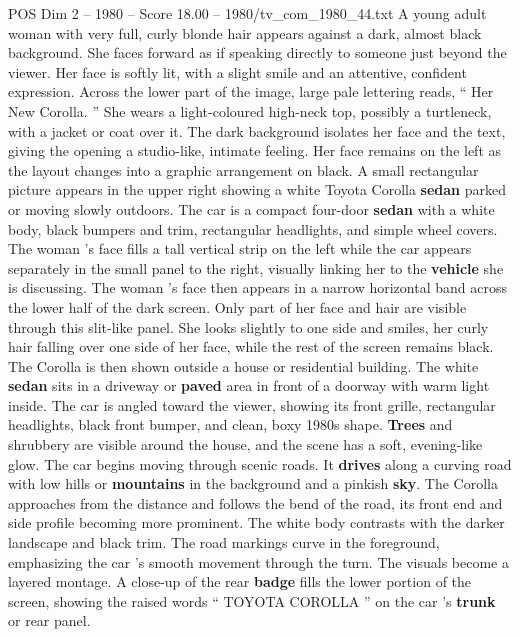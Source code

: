 \begin{textsample}{POS Dim 2 – 1980 – Score 18.00 – 1980/tv\_com\_1980\_44.txt}  \label{ex:f2_pos_064}
A young adult woman with very full, curly blonde hair appears against a dark, almost black background.
She faces forward as if speaking directly to someone just beyond the viewer.
Her face is softly lit, with a slight smile and an attentive, confident expression.
Across the lower part of the image, large pale lettering reads, “ Her New Corolla. ” She wears a light-coloured high-neck top, possibly a turtleneck, with a jacket or coat over it.
The dark background isolates her face and the text, giving the opening a studio-like, intimate feeling.
Her face remains on the left as the layout changes into a graphic arrangement on black.
A small rectangular picture appears in the upper right showing a white Toyota Corolla \textbf{sedan} parked or moving slowly outdoors.
The car is a compact four-door \textbf{sedan} with a white body, black bumpers and trim, rectangular headlights, and simple wheel covers.
The woman ’s face fills a tall vertical strip on the left while the car appears separately in the small panel to the right, visually linking her to the \textbf{vehicle} she is discussing.
The woman ’s face then appears in a narrow horizontal band across the lower half of the dark screen.
Only part of her face and hair are visible through this slit-like panel.
She looks slightly to one side and smiles, her curly hair falling over one side of her face, while the rest of the screen remains black.
The Corolla is then shown outside a house or residential building.
The white \textbf{sedan} sits in a driveway or \textbf{paved} area in front of a doorway with warm light inside.
The car is angled toward the viewer, showing its front grille, rectangular headlights, black front bumper, and clean, boxy 1980s shape. \textbf{Trees} and shrubbery are visible around the house, and the scene has a soft, evening-like glow.
The car begins moving through scenic roads.
It \textbf{drives} along a curving road with low hills or \textbf{mountains} in the background and a pinkish \textbf{sky}.
The Corolla approaches from the distance and follows the bend of the road, its front end and side profile becoming more prominent.
The white body contrasts with the darker landscape and black trim.
The road markings curve in the foreground, emphasizing the car ’s smooth movement through the turn.
The visuals become a layered montage.
A close-up of the rear \textbf{badge} fills the lower portion of the screen, showing the raised words “ TOYOTA COROLLA ” on the car ’s \textbf{trunk} or rear panel.

\end{textsample}
